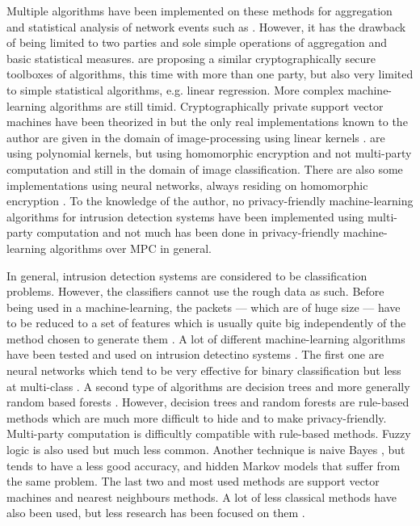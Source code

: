 Multiple algorithms have been implemented on these methods for aggregation and statistical analysis of network events such as \cite{Burkhart2010SEPIA:Statistics}. However, it has the drawback of being limited to two parties and sole simple operations of aggregation and basic statistical measures. \cite{Bogdanov2018Rmind:Analysis} are proposing a similar cryptographically secure toolboxes of algorithms, this time with more than one party, but also very limited to simple statistical algorithms, e.g. linear regression. More complex machine-learning algorithms are still timid. Cryptographically private support vector machines have been theorized in \cite{Laur2006CryptographicallyMachines} but the only real implementations known to the author are given in the domain of image-processing using linear kernels \cite{Makri2017PICS:SVM}. \cite{Barnett2017ImageData} are using polynomial kernels, but using homomorphic encryption and not multi-party computation and still in the domain of image classification. There are also some implementations using neural networks, always residing on homomorphic encryption \cite{Dowlin2016CryptoNets:Research}. To the knowledge of the author, no privacy-friendly machine-learning algorithms for intrusion detection systems have been implemented using multi-party computation and not much has been done in privacy-friendly machine-learning algorithms over MPC in general.

In general, intrusion detection systems are considered to be classification problems. However, the classifiers cannot use the rough data as such. Before being used in a machine-learning, the packets --- which are of huge size --- have to be reduced to a set of features \cite{Winter2018} which is usually quite big independently of the method chosen to generate them \cite{Sekar2002Specification-basedDetection,Cho2003EfficientModel} \cite{NewsomePolygraph:Worms}. A lot of different machine-learning algorithms have been tested and used on intrusion detectino systems \cite{Tsai2009IntrusionReview}. The first one are neural networks which tend to be very effective for binary classification but less at multi-class \cite{Mukkamala2002IntrusionMachines,Akashdeep2017AClassifier,Farnaaz2016RandomSystem}. A second type of algorithms are decision trees \cite{Meeragandhi2010EffectiveRules,Papamartzivanos2018Dendron:Systems} and more generally random based forests \cite{Soheily-Khah2018IntrusionDataset}. However, decision trees and random forests are rule-based methods which are much more difficult to hide and to make privacy-friendly. Multi-party computation is difficultly compatible with rule-based methods. Fuzzy logic \cite{Shanmugavadivu2011NetworkLogic,Rout2015ADetection} is also used but much less common. Another technique is naive Bayes \cite{Chebrolu2005FeatureSystems}, but tends to have a less good accuracy, and hidden Markov models \cite{Chen2016AnomalyModel,Tsai2007DetectingModels} that suffer from the same problem. The last two and most used methods are support vector machines and nearest neighbours methods. A lot of less classical methods have also been used, but less research has been focused on them \cite{Sabhnani2003ApplicationContext}.

